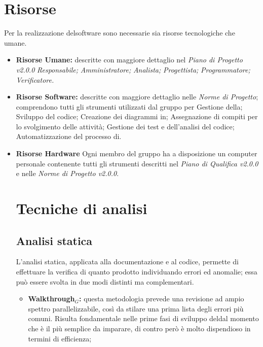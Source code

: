 \section{Risorse} Per la realizzazione delsoftware sono necessarie sia risorse tecnologiche che umane.
\begin{itemize}
	\item \textbf{Risorse Umane:} descritte con maggiore dettaglio nel \textit{Piano di Progetto v2.0.0}
	\subitem	\textit{Responsabile;}
	\subitem	\textit{Amministratore;}
	\subitem	\textit{Analista;}
	\subitem	\textit{Progettista;}
	\subitem	\textit{Programmatore;}
	\subitem	\textit{Verificatore.}
	
	\item \textbf{Risorse Software:} descritte con maggiore dettaglio nelle \textit{Norme di Progetto}; comprendono tutti gli strumenti utilizzati dal gruppo per
	\subitem Gestione della;
	\subitem Sviluppo del codice;
	\subitem Creazione dei diagrammi in;
	\subitem Assegnazione di compiti per lo svolgimento delle attività;
	\subitem Gestione dei test e dell'analisi del codice;
	\subitem Automatizzazione del processo di.

	\item \textbf{Risorse Hardware}
	Ogni membro del gruppo ha a disposizione un computer personale contenente tutti gli strumenti descritti nel \textit{Piano di Qualifica v2.0.0} e nelle 
	\textit{Norme di Progetto v2.0.0}.
	
\section{Tecniche di analisi}
\subsection{Analisi statica} \label{AnalisiStatica}
L’analisi statica, applicata alla documentazione e al
codice, permette di effettuare la verifica di quanto prodotto individuando errori ed
anomalie; essa può essere svolta in due modi distinti ma complementari.

\begin{itemize}
\item \textbf{Walkthrough$_{G}$:} questa metodologia prevede una revisione ad ampio
spettro parallelizzabile, così da stilare una prima lista degli errori più comuni. Risulta fondamentale nelle prime fasi di sviluppo deldal momento che è il più semplice da imparare, di contro però è molto dispendioso in termini di efficienza;


\end{itemize}
\end{itemize}
